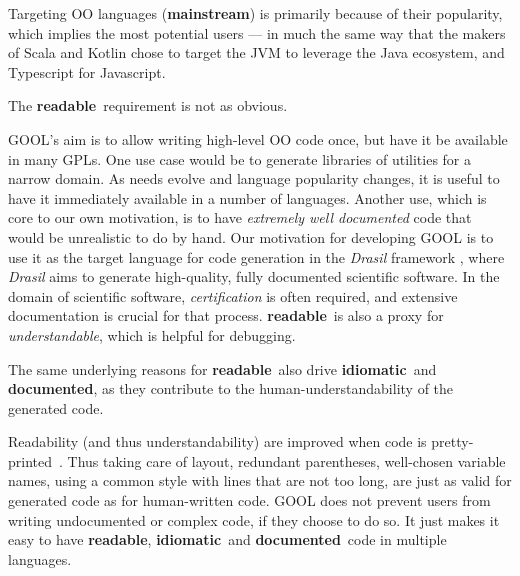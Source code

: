\documentclass[sigplan,review,prologue,dvipsnames]{acmart}
\newcommand{\Cplusplus}{C\texttt{++}}
\newcommand{\abbrev}[1]{\textbf{#1}}
\newcommand{\mainstream}{\abbrev{mainstream}}
\newcommand{\readable}{\abbrev{readable}}
\newcommand{\idiomatic}{\abbrev{idiomatic}}
\newcommand{\documented}{\abbrev{documented}}
\begin{document}
Targeting OO languages (\mainstream) is primarily because of their popularity,
which implies the most potential users --- in much the same way that the makers
of Scala and Kotlin chose to target the JVM to leverage the Java ecosystem, and
Typescript for Javascript.

The \readable~requirement is not as obvious. 

GOOL's aim is to allow writing
high-level OO code once, but have it be available in many GPLs. One use case
would be to generate libraries of utilities for a narrow domain. As needs
evolve and language popularity changes, it is useful to have it immediately
available in a number of languages. Another use, which is core to our
own motivation, is to have \emph{extremely well documented} code that would be 
unrealistic to do by hand. Our motivation for developing GOOL is to use it as 
the target language for code generation in the \textit{Drasil} framework 
\cite{SzymczakEtAl2016, Drasil2019}, where 
\textit{Drasil} aims to generate high-quality, fully documented scientific 
software. In the domain of scientific software, \emph{certification} is often 
required, and extensive documentation is crucial for that process. \readable~is 
also a proxy for \emph{understandable}, which is helpful for debugging.

The same underlying reasons for \readable~also drive \idiomatic~and \documented,
as they contribute to the human-understandability of the generated code.

Readability (and thus understandability) are improved when code is 
pretty-printed~\cite{buse2009learning}. Thus taking care of layout, redundant parentheses,
well-chosen variable names, using a common style with lines that are not too
long, are just as valid for generated code as for human-written code.
GOOL does not prevent users from writing undocumented or complex code, if they
choose to do so. It just makes it easy to have \readable, \idiomatic~and
\documented~code in multiple languages.
\end{document}
